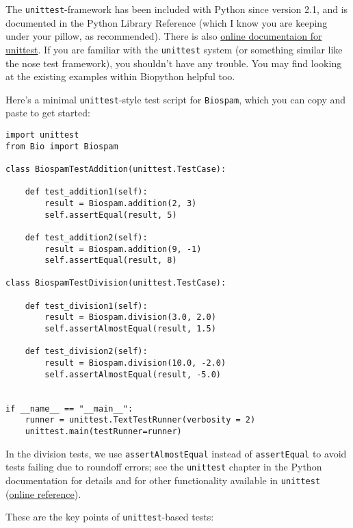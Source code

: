 The \verb|unittest|-framework has been included with Python since version
2.1, and is documented in the Python Library Reference (which I know you
are keeping under your pillow, as recommended).  There is also
\href{https://docs.python.org/3/library/unittest.html}{online documentaion
for unittest}.
If you are familiar with the \verb|unittest| system (or something similar
like the nose test framework), you shouldn't have any trouble.  You may
find looking at the existing examples within Biopython helpful too.

Here's a minimal \verb|unittest|-style test script for \verb|Biospam|,
which you can copy and paste to get started:

\begin{verbatim}
import unittest
from Bio import Biospam

class BiospamTestAddition(unittest.TestCase):

    def test_addition1(self):
        result = Biospam.addition(2, 3)
        self.assertEqual(result, 5)

    def test_addition2(self):
        result = Biospam.addition(9, -1)
        self.assertEqual(result, 8)

class BiospamTestDivision(unittest.TestCase):

    def test_division1(self):
        result = Biospam.division(3.0, 2.0)
        self.assertAlmostEqual(result, 1.5)

    def test_division2(self):
        result = Biospam.division(10.0, -2.0)
        self.assertAlmostEqual(result, -5.0)


if __name__ == "__main__":
    runner = unittest.TextTestRunner(verbosity = 2)
    unittest.main(testRunner=runner)
\end{verbatim}

In the division tests, we use \verb|assertAlmostEqual| instead of \verb|assertEqual| to avoid tests failing due to roundoff errors; see the \verb|unittest| chapter in the Python documentation for details and for other functionality available in \verb|unittest| (\href{https://docs.python.org/3/library/unittest.html}{online reference}).

These are the key points of \verb|unittest|-based tests:

